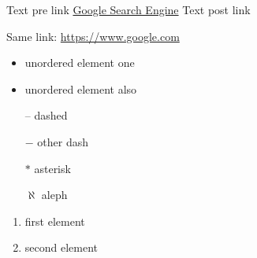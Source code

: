 \documentclass{article}
\begin{document}
    Text pre link \href{https://www.google.com}{Google Search Engine}
    Text post link

    Same link: \url{https://www.google.com}

    \begin{itemize}
        \item unordered element one
        \item unordered element also
        \item[--] dashed
        \item[$-$] other dash
        \item[$\ast$] asterisk
        \item[$\aleph$] aleph
    \end{itemize}

    \begin{enumerate}[label=(\alph*]
        \item first element
        \item second element
    \end{enumerate}
\end{document}
